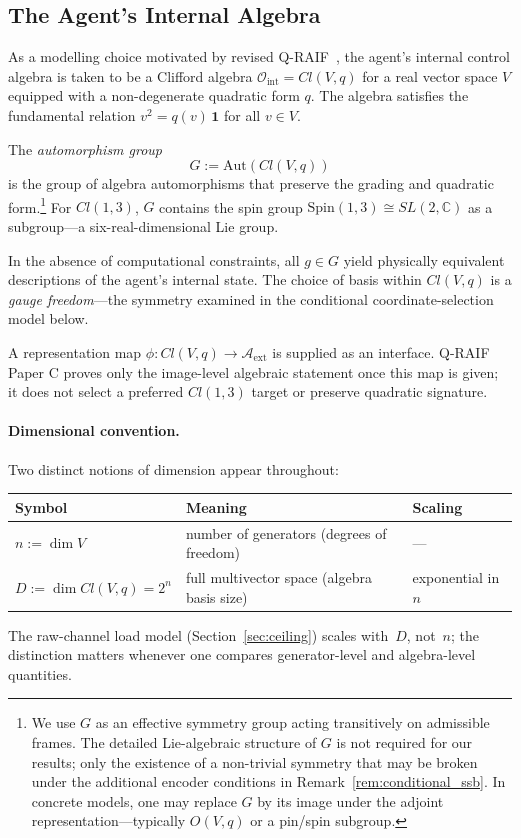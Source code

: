 \documentclass[12pt]{article}
\begin{document}
\subsection{The Agent's Internal Algebra}
\label{subsec:algebra}

As a modelling choice motivated by revised
Q-RAIF~\cite{Liu2026QRAIF_B,Liu2026QRAIF_C},
the agent's internal control algebra is taken to be a Clifford algebra
$\mathcal{O}_{\mathrm{int}} = Cl(V,q)$
for a real vector space $V$ equipped with a non-degenerate
quadratic form $q$.
The algebra satisfies the fundamental relation
$v^2 = q(v)\,\mathbf{1}$ for all $v \in V$.

The \emph{automorphism group}
\begin{equation}
\label{eq:gauge_group}
G := \mathrm{Aut}(Cl(V,q))
\end{equation}
is the group of algebra automorphisms that preserve the
grading and quadratic form.\footnote{\label{fn:gauge_group}%
We use $G$ as an effective symmetry group acting
transitively on admissible frames.
The detailed Lie-algebraic structure of $G$ is not required
for our results; only the existence of a non-trivial
symmetry that may be broken under the additional encoder
conditions in Remark~\ref{rem:conditional_ssb}.
In concrete models, one may replace $G$ by its image
under the adjoint representation---typically
$O(V,q)$ or a pin/spin subgroup.}
For $Cl(1,3)$, $G$ contains the spin group
$\mathrm{Spin}(1,3) \cong SL(2,\mathbb{C})$
as a subgroup---a six-real-dimensional Lie group.

In the absence of computational constraints, all
$g \in G$ yield physically equivalent descriptions of
the agent's internal state.
The choice of basis within $Cl(V,q)$ is a \emph{gauge
freedom}---the symmetry examined in the conditional
coordinate-selection model below.

A representation map
$\phi:Cl(V,q)\to\mathcal A_{\mathrm{ext}}$ is supplied as an
interface.  Q-RAIF Paper C proves only the image-level algebraic
statement once this map is given; it does not select a preferred
$Cl(1,3)$ target or preserve quadratic signature.

\paragraph{Dimensional convention.}
Two distinct notions of dimension appear throughout:
\begin{center}
\small
\begin{tabular}{@{}lll@{}}
\toprule
Symbol & Meaning & Scaling \\
\midrule
$n := \dim V$ & number of generators
  (degrees of freedom) & --- \\
$D := \dim Cl(V,q) = 2^n$ & full multivector space
  (algebra basis size) & exponential in $n$ \\
\bottomrule
\end{tabular}
\end{center}
The raw-channel load model (Section~\ref{sec:ceiling})
scales with~$D$, not~$n$; the distinction matters
whenever one compares generator-level and
algebra-level quantities.
\end{document}
